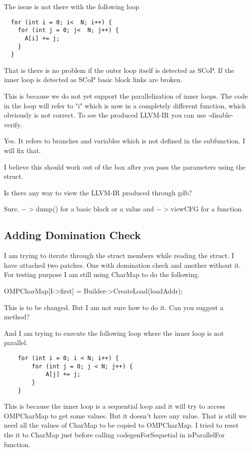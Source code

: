 \documentclass[a4paper,10pt]{article}
\begin{document}
  The issue is not there with the following loop
\begin{verbatim}
  for (int i = 0; i<  N; i++) {
    for (int j = 0; j<  N; j++) {
      A[i] += j;
    }
  }
\end{verbatim}
That is there is no problem if the outer loop itself is detected as
  SCoP. If the inner loop is detected as SCoP basic block links are
  broken.


  This is because we do not yet support the parallelization of inner loops. The code in the loop will refer to "i" which is now in a completely different function, which obviously is not correct. To see
  the produced LLVM-IR you can use -disable-verify.

  Yes. It refers to branches and variables which is not defined in the
  subfunction. I will fix that.


  I believe this should work out of the box after you pass the parameters using the struct.


  Is there any way to view the LLVM-IR produced through gdb?


  Sure. $->$dump() for a basic block or a value and $->$viewCFG for a function.

\subsection{Adding Domination Check}  
I am trying to iterate through the struct members while reading the
	struct. I have attached two patches. One with domination check and
	another without it. For testing purpose I am still using CharMap to do
	the following.

	OMPCharMap[I->first] = Builder->CreateLoad(loadAddr);

This is to be changed. But I am not sure how to do it. Can you suggest a method?

	And I am trying to execute the following loop where the inner loop is
	not parallel.
\begin{verbatim}
	for (int i = 0; i < N; i++) {
		for (int j = 0; j < N; j++) {
			A[j] += j;
		}
	}
\end{verbatim}

This is because the inner loop is a sequential loop and it will try to
	access OMPCharMap to get some values. But it doesn't have any value.
	That is still we need all the values of CharMap to be copied to
	OMPCharMap. I tried to reset the it to CharMap just before calling
	codegenForSequetial in isParallelFor function.
\end{document}
